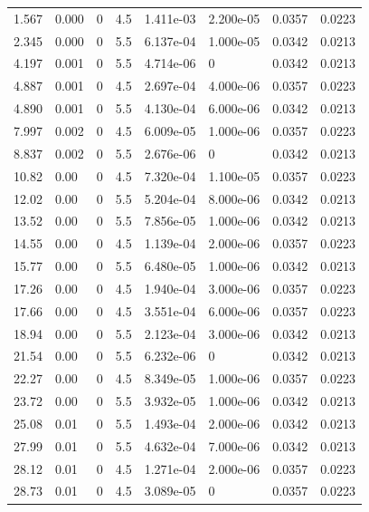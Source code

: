 \documentclass[preview]{standalone}
\begin{document}
{{\begin{tabular}{L{1.2cm}C{1.2cm} C{0.3cm}C{0.5cm} C{1.4cm}C{1.4cm} C{1.4cm}C{1.4cm}}
  1.567  &  0.000  & 0     & 4.5 &  1.411e-03  & 2.200e-05  & 0.0357 &  0.0223   \\ 
  2.345  &  0.000  & 0     & 5.5 &  6.137e-04  & 1.000e-05  & 0.0342 &  0.0213   \\ 
  4.197  &  0.001  & 0     & 5.5 &  4.714e-06  & 0  & 0.0342 &  0.0213   \\ 
  4.887  &  0.001  & 0     & 4.5 &  2.697e-04  & 4.000e-06  & 0.0357 &  0.0223   \\ 
  4.890  &  0.001  & 0     & 5.5 &  4.130e-04  & 6.000e-06  & 0.0342 &  0.0213   \\ 
  7.997  &  0.002  & 0     & 4.5 &  6.009e-05  & 1.000e-06  & 0.0357 &  0.0223   \\ 
  8.837  &  0.002  & 0     & 5.5 &  2.676e-06  & 0  & 0.0342 &  0.0213   \\ 
  10.82  &  0.00  & 0     & 4.5 &  7.320e-04  & 1.100e-05  & 0.0357 &  0.0223   \\ 
  12.02  &  0.00  & 0     & 5.5 &  5.204e-04  & 8.000e-06  & 0.0342 &  0.0213   \\ 
  13.52  &  0.00  & 0     & 5.5 &  7.856e-05  & 1.000e-06  & 0.0342 &  0.0213   \\ 
  14.55  &  0.00  & 0     & 4.5 &  1.139e-04  & 2.000e-06  & 0.0357 &  0.0223   \\ 
  15.77  &  0.00  & 0     & 5.5 &  6.480e-05  & 1.000e-06  & 0.0342 &  0.0213   \\ 
  17.26  &  0.00  & 0     & 4.5 &  1.940e-04  & 3.000e-06  & 0.0357 &  0.0223   \\ 
  17.66  &  0.00  & 0     & 4.5 &  3.551e-04  & 6.000e-06  & 0.0357 &  0.0223   \\ 
  18.94  &  0.00  & 0     & 5.5 &  2.123e-04  & 3.000e-06  & 0.0342 &  0.0213   \\ 
  21.54  &  0.00  & 0     & 5.5 &  6.232e-06  & 0  & 0.0342 &  0.0213   \\ 
  22.27  &  0.00  & 0     & 4.5 &  8.349e-05  & 1.000e-06  & 0.0357 &  0.0223   \\ 
  23.72  &  0.00  & 0     & 5.5 &  3.932e-05  & 1.000e-06  & 0.0342 &  0.0213   \\ 
  25.08  &  0.01  & 0     & 5.5 &  1.493e-04  & 2.000e-06  & 0.0342 &  0.0213   \\ 
  27.99  &  0.01  & 0     & 5.5 &  4.632e-04  & 7.000e-06  & 0.0342 &  0.0213   \\ 
  28.12  &  0.01  & 0     & 4.5 &  1.271e-04  & 2.000e-06  & 0.0357 &  0.0223   \\ 
  28.73  &  0.01  & 0     & 4.5 &  3.089e-05  & 0  & 0.0357 &  0.0223   \\ 

\end{tabular}}}
\end{document}
